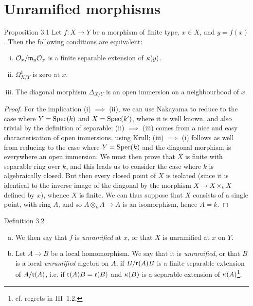 \section{Unramified morphisms}
\label{I.3}

\begin{itenv}{Proposition 3.1}
\label{I.3.1}
  Let $f\colon X\to Y$ be a morphism of finite type, $x\in X$, and $y=f(x)$.
  Then the following conditions are equivalent:
  \begin{enumerate}[(i)]
    \item $\cal{O}_x/\frak{m}_y\cal{O}_x$ is a finite separable extension of $\kres(y)$.
    \item $\Omega_{X/Y}^1$ is zero at $x$.
    \item The diagonal morphism $\Delta_{X/Y}$ is an open immersion on a neighbourhood of $x$.
  \end{enumerate}
\end{itenv}

\begin{proof}
  For the implication (i) $\implies$ (ii), we can use Nakayama to reduce to the case where $Y=\Spec(k)$ and $X=\Spec(k')$, where it is well known, and also trivial by the definition of separable;
  (ii) $\implies$ (iii) comes from a nice and easy characterisation of open immersions, using Krull;
  (iii) $\implies$ (i) follows as well from reducing to the case where $Y=\Spec(k)$ and the diagonal morphism is everywhere an open immersion.
  We must then prove that $X$ is finite with separable ring over $k$, and this leads us to consider the case where $k$ is algebraically closed.
  But then every closed point of $X$ is isolated (since it is identical to the inverse image of the diagonal by the morphism $X\to X\times_k X$ defined by $x$), whence $X$ is finite.
  We can thus suppose that $X$ consists of a single point, with ring $A$, and so $A\otimes_k A\to A$ is an isomorphism, hence $A=k$.
\end{proof}

\begin{rmenv}{Definition 3.2}
\label{I.3.2}
  \begin{enumerate}[(a)]
    \item We then say that $f$ is \emph{unramified} at $x$, or that $X$ is unramified at $x$ on $Y$.
    \item Let $A\to B$ be a local homomorphism.
      We say that it is \emph{unramified}, or that $B$ is a local \emph{unramified} algebra on $A$, if $B/\frak{r}(A)B$ is a finite separable extension of $A/\frak{r}(A)$, i.e. if $\frak{r}(A)B=\frak{r}(B)$ and $\kres(B)$ is a separable extension of $\kres(A)$\footnote{cf. regrets in III~1.2.}.
  \end{enumerate}
\end{rmenv}

